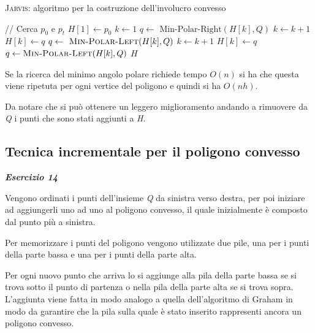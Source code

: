 \begin{breakablealgorithm}
	\caption{\textsc{Jarvis}: algoritmo per la costruzione dell'involucro convesso}
	\begin{algorithmic}[1]
			    \State // Cerca $p_0$ e $p_t$
			    \State $H[1] \gets p_0$ 
			    \State $k \gets 1$
			        \State $q \gets \text{ Min-Polar-Right}(H[k],Q)$ 
			        \State $k \gets k +1$
			        \State $H[k] \gets q$
			    \EndWhile
			    \State $q \gets \textsc{ Min-Polar-Left}(H[k],Q)$
			        \State $k \gets k+1$
			        \State $H[k] \gets q$
			        \State $q \gets \textsc{Min-Polar-Left}(H[k],Q)$
			    \EndWhile
			    \State \Return $H$
			\EndFunction
	\end{algorithmic}
\end{breakablealgorithm}

Se la ricerca del minimo angolo polare richiede tempo $O(n)$ si ha che questa viene ripetuta per ogni vertice del poligono e quindi si ha $O(nh)$.

Da notare che si può ottenere un leggero miglioramento andando a rimuovere da \emph{Q} i punti che sono stati aggiunti a \emph{H}.

\subsection{Tecnica incrementale per il poligono convesso}\label{tecnica-incrementale-per-il-poligono-convesso-es-14}

\textbf{\textit{Esercizio 14}} 

Vengono ordinati i punti dell'insieme \emph{Q} da sinistra verso destra, per poi iniziare ad aggiungerli uno ad uno al poligono convesso, il quale inizialmente è composto dal punto più a sinistra.

Per memorizzare i punti del poligono vengono utilizzate due pile, una per i punti della parte bassa e una per i punti della parte alta.

Per ogni nuovo punto che arriva lo si aggiunge alla pila della parte bassa se si trova sotto il punto di partenza o nella pila della parte alta se si trova sopra. L'aggiunta viene fatta in modo analogo a quella dell'algoritmo di Graham in modo da garantire che la pila sulla quale è stato inserito rappresenti ancora un poligono convesso.

